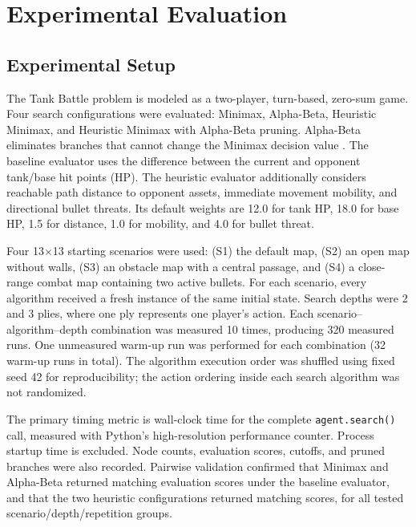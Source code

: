 
\section{Experimental Evaluation}
\label{sec:task2-experiments}

\subsection{Experimental Setup}
The Tank Battle problem is modeled as a two-player, turn-based, zero-sum game. Four search configurations were evaluated: Minimax, Alpha-Beta, Heuristic Minimax, and Heuristic Minimax with Alpha-Beta pruning. Alpha-Beta eliminates branches that cannot change the Minimax decision value \cite{knuth1975analysis}. The baseline evaluator uses the difference between the current and opponent tank/base hit points (HP). The heuristic evaluator additionally considers reachable path distance to opponent assets, immediate movement mobility, and directional bullet threats. Its default weights are 12.0 for tank HP, 18.0 for base HP, 1.5 for distance, 1.0 for mobility, and 4.0 for bullet threat.

Four 13$\times$13 starting scenarios were used: (S1) the default map, (S2) an open map without walls, (S3) an obstacle map with a central passage, and (S4) a close-range combat map containing two active bullets. For each scenario, every algorithm received a fresh instance of the same initial state. Search depths were 2 and 3 plies, where one ply represents one player's action. Each scenario--algorithm--depth combination was measured 10 times, producing 320 measured runs. One unmeasured warm-up run was performed for each combination (32 warm-up runs in total). The algorithm execution order was shuffled using fixed seed 42 for reproducibility; the action ordering inside each search algorithm was not randomized.

The primary timing metric is wall-clock time for the complete \texttt{agent.search()} call, measured with Python's high-resolution performance counter. Process startup time is excluded. Node counts, evaluation scores, cutoffs, and pruned branches were also recorded. Pairwise validation confirmed that Minimax and Alpha-Beta returned matching evaluation scores under the baseline evaluator, and that the two heuristic configurations returned matching scores, for all tested scenario/depth/repetition groups.

